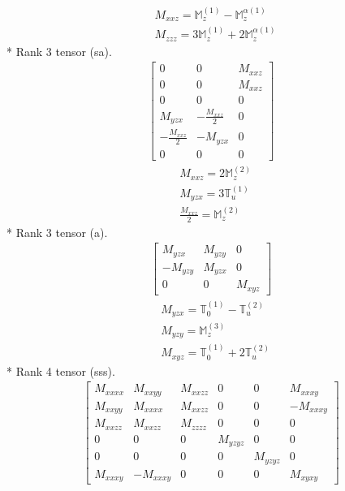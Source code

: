 \documentclass[fleqn,8pt,landscape]{jsarticle}
\begin{document}
\begin{align*}
& M_{xxz} = \mathbb{M}_{z}^{(1)} - \mathbb{M}_{z}^{\alpha(1)} \\
& M_{zzz} = 3 \mathbb{M}_{z}^{(1)} + 2 \mathbb{M}_{z}^{\alpha(1)}
\end{align*}
* Rank 3 tensor (sa).
\begin{align*}
\begin{bmatrix} 0 & 0 & M_{xxz} \\ 0 & 0 & M_{xxz} \\ 0 & 0 & 0 \\ M_{yzx} & - \frac{M_{xxz}}{2} & 0 \\ - \frac{M_{xxz}}{2} & - M_{yzx} & 0 \\ 0 & 0 & 0 \end{bmatrix}
\end{align*}
\begin{align*}
& M_{xxz} = 2 \mathbb{M}_{z}^{(2)} \\
& M_{yzx} = 3 \mathbb{T}_{u}^{(1)} \\
& \frac{M_{xxz}}{2} = \mathbb{M}_{z}^{(2)}
\end{align*}
* Rank 3 tensor (a).
\begin{align*}
\begin{bmatrix} M_{yzx} & M_{yzy} & 0 \\ - M_{yzy} & M_{yzx} & 0 \\ 0 & 0 & M_{xyz} \end{bmatrix}
\end{align*}
\begin{align*}
& M_{yzx} = \mathbb{T}_{0}^{(1)} - \mathbb{T}_{u}^{(2)} \\
& M_{yzy} = \mathbb{M}_{z}^{(3)} \\
& M_{xyz} = \mathbb{T}_{0}^{(1)} + 2 \mathbb{T}_{u}^{(2)}
\end{align*}
* Rank 4 tensor (sss).
\begin{align*}
\begin{bmatrix} M_{xxxx} & M_{xxyy} & M_{xxzz} & 0 & 0 & M_{xxxy} \\ M_{xxyy} & M_{xxxx} & M_{xxzz} & 0 & 0 & - M_{xxxy} \\ M_{xxzz} & M_{xxzz} & M_{zzzz} & 0 & 0 & 0 \\ 0 & 0 & 0 & M_{yzyz} & 0 & 0 \\ 0 & 0 & 0 & 0 & M_{yzyz} & 0 \\ M_{xxxy} & - M_{xxxy} & 0 & 0 & 0 & M_{xyxy} \end{bmatrix}
\end{align*}
\end{document}
